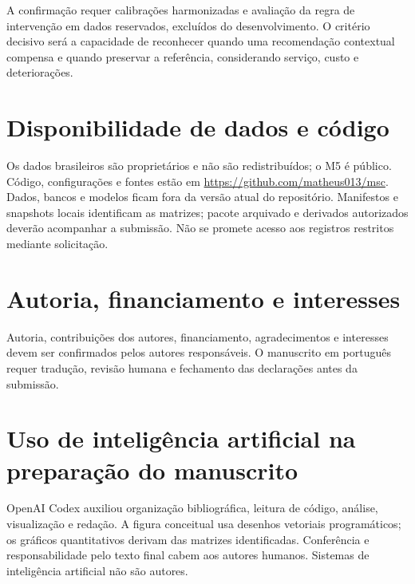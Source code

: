 \documentclass[preprint,12pt]{elsarticle}
\begin{document}
A confirmação requer calibrações harmonizadas e avaliação da regra de intervenção em dados reservados, excluídos do desenvolvimento. O critério decisivo será a capacidade de reconhecer quando uma recomendação contextual compensa e quando preservar a referência, considerando serviço, custo e deteriorações.

\section*{Disponibilidade de dados e código}
Os dados brasileiros são proprietários e não são redistribuídos; o M5 é público. Código, configurações e fontes estão em \url{https://github.com/matheus013/msc}. Dados, bancos e modelos ficam fora da versão atual do repositório. Manifestos e snapshots locais identificam as matrizes; pacote arquivado e derivados autorizados deverão acompanhar a submissão. Não se promete acesso aos registros restritos mediante solicitação.

\section*{Autoria, financiamento e interesses}
Autoria, contribuições dos autores, financiamento, agradecimentos e interesses devem ser confirmados pelos autores responsáveis. O manuscrito em português requer tradução, revisão humana e fechamento das declarações antes da submissão.

\section*{Uso de inteligência artificial na preparação do manuscrito}
OpenAI Codex auxiliou organização bibliográfica, leitura de código, análise, visualização e redação. A figura conceitual usa desenhos vetoriais programáticos; os gráficos quantitativos derivam das matrizes identificadas. Conferência e responsabilidade pelo texto final cabem aos autores humanos. Sistemas de inteligência artificial não são autores.



\end{document}
